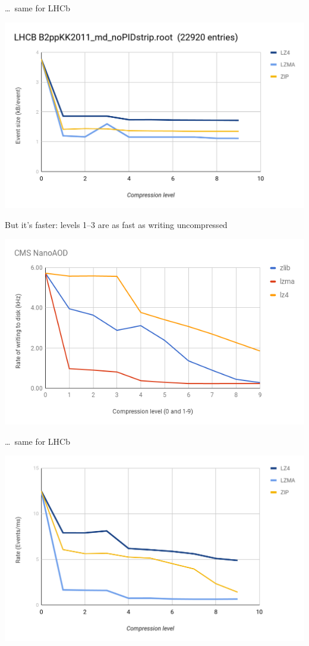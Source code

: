 \documentclass[aspectratio=169]{beamer}
\begin{document}
\begin{frame}{\ldots\ same for LHCb}
\vspace{0.1 cm}
\begin{center}
\includegraphics[width=0.9\linewidth]{lhcb-eventsize.png}
\end{center}
\end{frame}

\begin{frame}{But it's faster: levels 1--3 are as fast as writing uncompressed}
\vspace{0.1 cm}
\begin{center}
\includegraphics[width=0.9\linewidth]{write-vs-compression.png}
\end{center}
\end{frame}

\begin{frame}{\ldots\ same for LHCb}
\vspace{0.1 cm}
\begin{center}
\includegraphics[width=0.9\linewidth]{lhcb-eventrate.png}
\end{center}
\end{frame}
\end{document}
